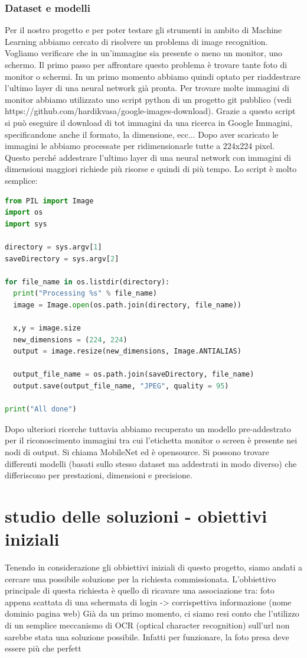 \documentclass[twoside]{supsistudent}
\newcommand{\Decaa}{\newline\vspace{0.5mm}\newline\noindent}
\begin{document}
\subsubsection{Dataset e modelli}%
Per il nostro progetto e per poter testare gli strumenti in ambito di Machine Learning abbiamo cercato di risolvere un problema di image recognition. Vogliamo verificare che in un'immagine sia presente o meno un monitor, uno schermo. Il primo passo per affrontare questo problema è trovare tante foto di monitor o schermi. In un primo momento abbiamo quindi optato per riaddestrare l'ultimo layer di una neural network già pronta. 
Per trovare molte immagini di monitor abbiamo utilizzato uno script python di un progetto git pubblico (vedi https://github.com/hardikvasa/google-images-download). Grazie a questo script si può eseguire il download di tot immagini da una ricerca in Google Immagini, specificandone anche il formato, la dimensione, ecc... Dopo aver scaricato le immagini le abbiamo processate per ridimensionarle tutte a 224x224 pixel. Questo perché addestrare l'ultimo layer di una neural network con immagini di dimensioni maggiori richiede più risorse e quindi di più tempo. Lo script è molto semplice:
\begin{lstlisting}[language=Python]
from PIL import Image
import os
import sys

directory = sys.argv[1]
saveDirectory = sys.argv[2]

for file_name in os.listdir(directory):
  print("Processing %s" % file_name)
  image = Image.open(os.path.join(directory, file_name))

  x,y = image.size
  new_dimensions = (224, 224)
  output = image.resize(new_dimensions, Image.ANTIALIAS)

  output_file_name = os.path.join(saveDirectory, file_name)
  output.save(output_file_name, "JPEG", quality = 95)

print("All done")
\end{lstlisting}

Dopo ulteriori ricerche tuttavia abbiamo recuperato un modello pre-addestrato per il riconoscimento immagini tra cui l'etichetta monitor o screen è presente nei nodi di output. Si chiama MobileNet ed è opensource. Si possono trovare differenti modelli (basati sullo stesso dataset ma addestrati in modo diverso) che differiscono per prestazioni, dimensioni e precisione.

\section{studio delle soluzioni - obiettivi iniziali}
Tenendo in considerazione gli obbiettivi iniziali di questo progetto, siamo andati a cercare una possibile soluzione per la richiesta commissionata.
\Decaa
L'obbiettivo principale di questa richiesta è quello di ricavare una associazione tra: foto appena scattata di una schermata di login -> corrispettiva informazione (nome dominio pagina web)
\Decaa
Già da un primo momento, ci siamo resi conto che l'utilizzo di un semplice meccanismo di OCR (optical character recognition) sull'url non sarebbe stata una soluzione possibile. Infatti per funzionare, la foto presa deve essere più che perfett
\end{document}
